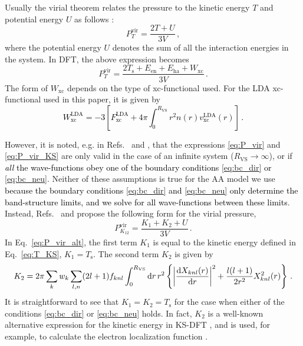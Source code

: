 \documentclass[%
 preprint,
 superscriptaddress,
 amsmath,amssymb,
longbibliography,
]{revtex4-2}
\newcommand{\RWS}{R_\textrm{VS}}
\newcommand{\change}[1]{\textcolor{black}{#1}}
\newcommand{\RVS}{R_\textrm{VS}}
\newcommand{\Pvirt}{P^\textrm{vir}_T}
\newcommand{\Pvirk}{P^\textrm{vir}_{K_{12}}}
\begin{document}
Usually the virial theorem relates the pressure to the kinetic energy $T$ and potential energy $U$ as follows \cite{virial_slater,virial_mclellan,virial_nielsen}:
\begin{equation}\label{eq:P_vir}
    \Pvirt = \frac{2T + U}{3V}\,,
\end{equation}
where the potential energy $U$ denotes the sum of all the interaction energies in the system. In DFT, the above expression becomes \cite{PBE_virial}
\begin{equation}\label{eq:P_vir_KS}
    \Pvirt = \frac{2 T_\textrm{s} + E_\textrm{en}+E_\textrm{ha} + W_\textrm{xc}}{3V}\,.
\end{equation}
The form of $W_\textrm{xc}$ depends on the type of xc-functional used. For the LDA xc-functional used in this paper, it is given by \cite{PBE_virial}
\change{
\begin{equation}
    W_\textrm{xc}^\textrm{LDA} = -3 \left[ F_\textrm{xc}^\textrm{LDA} + 4\pi\int_0^{\RWS} r^2 n(r) v_\textrm{xc}^\textrm{LDA}(r) \right]\,.
\end{equation}}

However, it is noted, e.g. in Refs.~\cite{stress_tensor_more} and \cite{Pain_virial}, that the expressions \eqref{eq:P_vir} and \eqref{eq:P_vir_KS} are only valid in the case of an infinite system ($\RWS\to\infty$), or if \change{\emph{all} the wave-functions obey one of the boundary conditions \eqref{eq:bc_dir} or \eqref{eq:bc_neu}}.
Neither of these assumptions is true for the AA model we use \change{because the boundary conditions \eqref{eq:bc_dir} and \eqref{eq:bc_neu} only determine the band-structure limits, and we solve for all wave-functions between these limits}. Instead, Refs.~ and  propose the following form for the virial pressure,
\begin{equation}\label{eq:P_vir_alt}
    \Pvirk = \frac{K_1 + K_2 + U}{3V}\,.
\end{equation}
In Eq.~\eqref{eq:P_vir_alt}, the first term $K_1$ is equal to the kinetic energy defined in Eq.~\eqref{eq:T_KS}, $K_1=T_\textrm{s}$. The second term $K_2$ is given by
\begin{equation}
    K_2= 2\pi  \sum_k w_k \sum_{l,n} (2l+1) f_{knl} \int_0^{\RVS} \dd{r} r^2 \left\{\left| \dv{\rnl}{r} \right|^2 + \frac{l(l+1)}{2r^2}X_{knl}^2(r) \right\}\,.
\end{equation}
It is straightforward to see that $K_1=K_2=T_\textrm{s}$ for the case when either of the conditions \eqref{eq:bc_dir} or \eqref{eq:bc_neu} holds. In fact, $K_2$ is a well-known alternative expression for the kinetic energy in KS-DFT \cite{Ayers_KED,Cohen_1979}, and is used, for example, to calculate the electron localization function \cite{Savin_ELF_1996}. 
\end{document}
